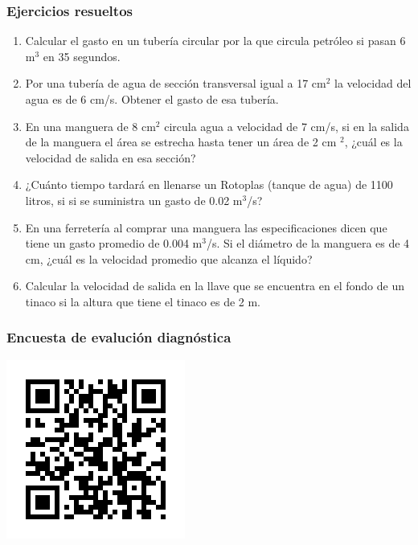 \documentclass[handout]{beamer}
\begin{document}
\begin{frame}[allowframebreaks,t]
\frametitle{Ejercicios resueltos}
\begin{enumerate}
\item Calcular el gasto en un tubería circular por la que circula
  petróleo si pasan 6 m$^3$ en 35 segundos.
\item Por una tubería de agua de sección transversal igual a 17 cm$^2$ la velocidad del
  agua es de 6 cm/s. Obtener el gasto de esa tubería.
\item En una manguera de 8 cm$^2$ circula agua a velocidad de 7 cm/s, si en la salida de
  la manguera el área se estrecha hasta tener un área de 2 cm $^2$, ¿cuál es la velocidad
  de salida en esa sección?
\item ¿Cuánto tiempo tardará en llenarse un Rotoplas (tanque de agua) de 1100 litros, si
  si se suministra un gasto de 0.02 m$^3$/s?
\item En una ferretería al comprar una manguera las especificaciones dicen que tiene un
  gasto promedio de 0.004 m$^3$/s. Si el diámetro de la manguera es de 4 cm, ¿cuál es la
  velocidad promedio que alcanza el líquido?
\item Calcular la velocidad de salida en la llave que se encuentra en el fondo de un
  tinaco si la altura que tiene el tinaco es de 2 m.
\end{enumerate}
\end{frame}


\begin{frame}
  \frametitle{Encuesta de evalución diagnóstica}
  \begin{center}
    \includegraphics[scale=0.95]{qrevaluacion}
  \end{center}
\end{frame}



\end{document}
